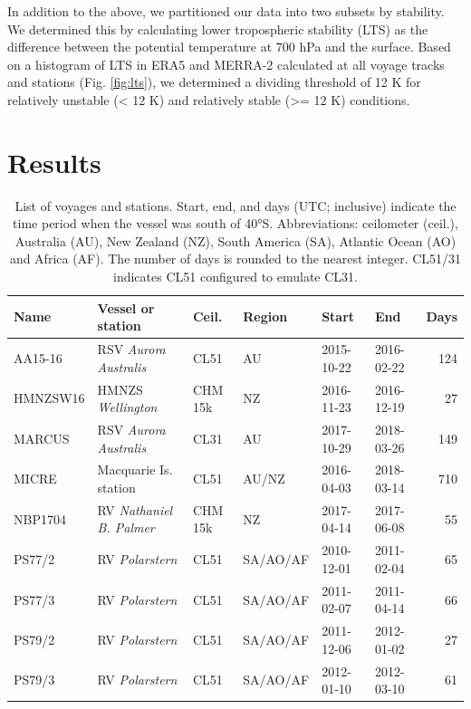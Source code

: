 \documentclass[12pt,a4paper]{article}
\begin{document}
In addition to the above, we partitioned our data into two subsets by
stability. We determined this by calculating lower tropospheric stability (LTS)
as the difference between the potential temperature at 700 hPa and the surface.
Based on a histogram of LTS in ERA5 and MERRA-2 calculated at all voyage tracks
and stations (Fig.  \ref{fig:lts}), we determined a dividing threshold of 12 K
for relatively unstable (< 12 K) and relatively stable (>= 12 K) conditions.

\section{Results}
\label{sec:results}

\begin{table}
\caption{
List of voyages and stations. Start, end, and days (UTC; inclusive)
indicate the time period when the vessel was south of 40°S. Abbreviations:
ceilometer (ceil.), Australia (AU), New Zealand (NZ), South America (SA),
Atlantic Ocean (AO) and Africa (AF). The number of days is rounded to the
nearest integer. CL51/31 indicates CL51 configured to emulate CL31.
}
\label{tab:voyages}
\small
\begin{tabular}{llllllr}
\textbf{Name} & \textbf{Vessel or station} & \textbf{Ceil.} & \textbf{Region} & \textbf{Start} & \textbf{End} & \textbf{Days}\\
\hline
AA15-16  & RSV \emph{Aurora Australis}   & CL51    & AU       & 2015-10-22 & 2016-02-22 & 124 \\
HMNZSW16 & HMNZS \emph{Wellington}       & CHM 15k & NZ       & 2016-11-23 & 2016-12-19 & 27 \\
MARCUS   & RSV \emph{Aurora Australis}   & CL31    & AU       & 2017-10-29 & 2018-03-26 & 149 \\
MICRE    & Macquarie Is. station         & CL51    & AU/NZ    & 2016-04-03 & 2018-03-14 & 710 \\
NBP1704  & RV \emph{Nathaniel B. Palmer} & CHM 15k & NZ       & 2017-04-14 & 2017-06-08 & 55 \\
PS77/2   & RV \emph{Polarstern}          & CL51    & SA/AO/AF & 2010-12-01 & 2011-02-04 & 65 \\
PS77/3   & RV \emph{Polarstern}          & CL51    & SA/AO/AF & 2011-02-07 & 2011-04-14 & 66 \\
PS79/2   & RV \emph{Polarstern}          & CL51    & SA/AO/AF & 2011-12-06 & 2012-01-02 & 27 \\
PS79/3   & RV \emph{Polarstern}          & CL51    & SA/AO/AF & 2012-01-10 & 2012-03-10 & 61 \\

\end{tabular}
\end{table}
\end{document}
